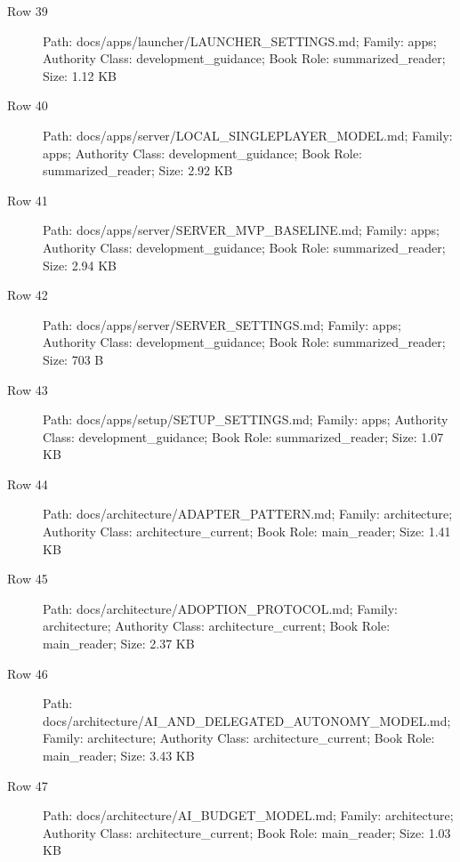 \documentclass[9pt,a4paper]{book}
\begin{document}
\begin{description}
\item[Row 39] Path: docs/\allowbreak{}apps/\allowbreak{}launcher/\allowbreak{}LAUNCHER\_\allowbreak{}SETTINGS.\allowbreak{}md; Family: apps; Authority Class: development\_\allowbreak{}guidance; Book Role: summarized\_\allowbreak{}reader; Size: 1.\allowbreak{}12 KB
\item[Row 40] Path: docs/\allowbreak{}apps/\allowbreak{}server/\allowbreak{}LOCAL\_\allowbreak{}SINGLEPLAYER\_\allowbreak{}MODEL.\allowbreak{}md; Family: apps; Authority Class: development\_\allowbreak{}guidance; Book Role: summarized\_\allowbreak{}reader; Size: 2.\allowbreak{}92 KB
\item[Row 41] Path: docs/\allowbreak{}apps/\allowbreak{}server/\allowbreak{}SERVER\_\allowbreak{}MVP\_\allowbreak{}BASELINE.\allowbreak{}md; Family: apps; Authority Class: development\_\allowbreak{}guidance; Book Role: summarized\_\allowbreak{}reader; Size: 2.\allowbreak{}94 KB
\item[Row 42] Path: docs/\allowbreak{}apps/\allowbreak{}server/\allowbreak{}SERVER\_\allowbreak{}SETTINGS.\allowbreak{}md; Family: apps; Authority Class: development\_\allowbreak{}guidance; Book Role: summarized\_\allowbreak{}reader; Size: 703 B
\item[Row 43] Path: docs/\allowbreak{}apps/\allowbreak{}setup/\allowbreak{}SETUP\_\allowbreak{}SETTINGS.\allowbreak{}md; Family: apps; Authority Class: development\_\allowbreak{}guidance; Book Role: summarized\_\allowbreak{}reader; Size: 1.\allowbreak{}07 KB
\item[Row 44] Path: docs/\allowbreak{}architecture/\allowbreak{}ADAPTER\_\allowbreak{}PATTERN.\allowbreak{}md; Family: architecture; Authority Class: architecture\_\allowbreak{}current; Book Role: main\_\allowbreak{}reader; Size: 1.\allowbreak{}41 KB
\item[Row 45] Path: docs/\allowbreak{}architecture/\allowbreak{}ADOPTION\_\allowbreak{}PROTOCOL.\allowbreak{}md; Family: architecture; Authority Class: architecture\_\allowbreak{}current; Book Role: main\_\allowbreak{}reader; Size: 2.\allowbreak{}37 KB
\item[Row 46] Path: docs/\allowbreak{}architecture/\allowbreak{}AI\_\allowbreak{}AND\_\allowbreak{}DELEGATED\_\allowbreak{}AUTONOMY\_\allowbreak{}MODEL.\allowbreak{}md; Family: architecture; Authority Class: architecture\_\allowbreak{}current; Book Role: main\_\allowbreak{}reader; Size: 3.\allowbreak{}43 KB
\item[Row 47] Path: docs/\allowbreak{}architecture/\allowbreak{}AI\_\allowbreak{}BUDGET\_\allowbreak{}MODEL.\allowbreak{}md; Family: architecture; Authority Class: architecture\_\allowbreak{}current; Book Role: main\_\allowbreak{}reader; Size: 1.\allowbreak{}03 KB

\end{description}
\end{document}
